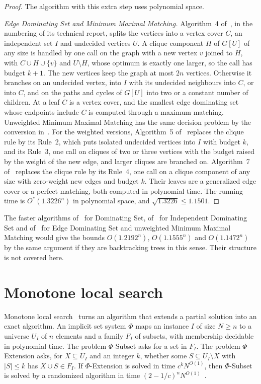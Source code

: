 \documentclass[11pt]{article}
\theoremstyle{remark}
\begin{document}
\begin{proof}
The algorithm with this extra step uses polynomial space.

\emph{Edge Dominating Set and Minimum Maximal Matching.} Algorithm~4 of~\cite{RB12}, in the numbering of its technical report, splits the vertices into a vertex cover $C$, an independent set $I$ and undecided vertices $U$. A clique component $H$ of $G[U]$ of any size is handled by one call on the graph with a new vertex $v$ joined to $H$, with $C \cup H \cup \{v\}$ and $U \setminus H$, whose optimum is exactly one larger, so the call has budget $k + 1$. The new vertices keep the graph at most $2n$ vertices. Otherwise it branches on an undecided vertex, into $I$ with its undecided neighbours into $C$, or into $C$, and on the paths and cycles of $G[U]$ into two or a constant number of children. At a leaf $C$ is a vertex cover, and the smallest edge dominating set whose endpoints include $C$ is computed through a maximum matching. Unweighted Minimum Maximal Matching has the same decision problem by the conversion in~\cite{RB12}. For the weighted versions, Algorithm~5 of~\cite{RB12} replaces the clique rule by its Rule~2, which puts isolated undecided vertices into $I$ with budget $k$, and its Rule~3, one call on cliques of two or three vertices with the budget raised by the weight of the new edge, and larger cliques are branched on. Algorithm~7 of~\cite{RB12} replaces the clique rule by its Rule~4, one call on a clique component of any size with zero-weight new edges and budget $k$. Their leaves are a generalized edge cover or a perfect matching, both computed in polynomial time. The running time is $O^*(1.3226^n)$ in polynomial space, and $\sqrt{1.3226} \le 1.1501$.
\end{proof}

The faster algorithms of~\cite{Iwa11} for Dominating Set, of~\cite{BDEP13} for Independent Dominating Set and of~\cite{XN14} for Edge Dominating Set and unweighted Minimum Maximal Matching would give the bounds $O(1.2192^n)$, $O(1.1555^n)$ and $O(1.1472^n)$ by the same argument if they are backtracking trees in this sense. Their structure is not covered here.

\section{Monotone local search}\label{sec:mls}

Monotone local search~\cite{FGLS19} turns an algorithm that extends a partial solution into an exact algorithm. An implicit set system $\Phi$ maps an instance $I$ of size $N \ge n$ to a universe $U_I$ of $n$ elements and a family $F_I$ of subsets, with membership decidable in polynomial time. The problem $\Phi$-Subset asks for a set in $F_I$. The problem $\Phi$-Extension asks, for $X \subseteq U_I$ and an integer $k$, whether some $S \subseteq U_I \setminus X$ with $|S| \le k$ has $X \cup S \in F_I$. If $\Phi$-Extension is solved in time $c^k N^{O(1)}$, then $\Phi$-Subset is solved by a randomized algorithm in time $(2 - 1/c)^n N^{O(1)}$~\cite{FGLS19}.
\end{document}
